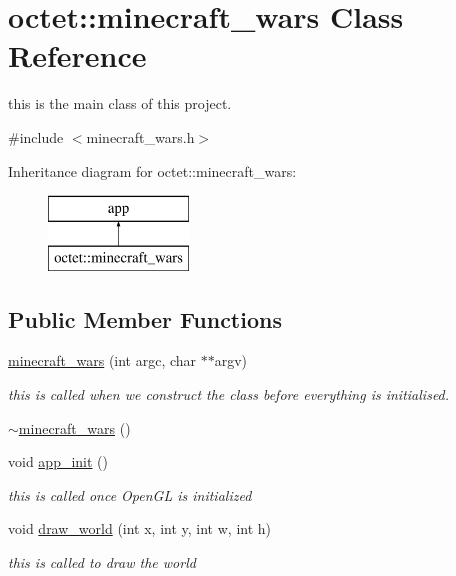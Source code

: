 \hypertarget{classoctet_1_1minecraft__wars}{\section{octet\+:\+:minecraft\+\_\+wars Class Reference}
\label{classoctet_1_1minecraft__wars}
}


this is the main class of this project.  




{\ttfamily \#include $<$minecraft\+\_\+wars.\+h$>$}

Inheritance diagram for octet\+:\+:minecraft\+\_\+wars\+:\begin{figure}[H]
\begin{center}
\leavevmode
\includegraphics[height=2.000000cm]{classoctet_1_1minecraft__wars}
\end{center}
\end{figure}
\subsection*{Public Member Functions}
\begin{DoxyCompactItemize}
\item 
\hyperlink{classoctet_1_1minecraft__wars_acae462db6a97b0f3f2010a3d6fdda734}{minecraft\+\_\+wars} (int argc, char $\ast$$\ast$argv)
\begin{DoxyCompactList}\small\item\em this is called when we construct the class before everything is initialised. \end{DoxyCompactList}\item 
\hyperlink{classoctet_1_1minecraft__wars_af51fd5e1f5613ad1e2b78b9a1132a27d}{$\sim$minecraft\+\_\+wars} ()
\item 
void \hyperlink{classoctet_1_1minecraft__wars_a4d7e0650790969c0ecf286deab0c2b63}{app\+\_\+init} ()
\begin{DoxyCompactList}\small\item\em this is called once Open\+G\+L is initialized \end{DoxyCompactList}\item 
void \hyperlink{classoctet_1_1minecraft__wars_a483435b1af8285d343873eeecaaeca0a}{draw\+\_\+world} (int x, int y, int w, int h)
\begin{DoxyCompactList}\small\item\em this is called to draw the world \end{DoxyCompactList}\end{DoxyCompactItemize}
